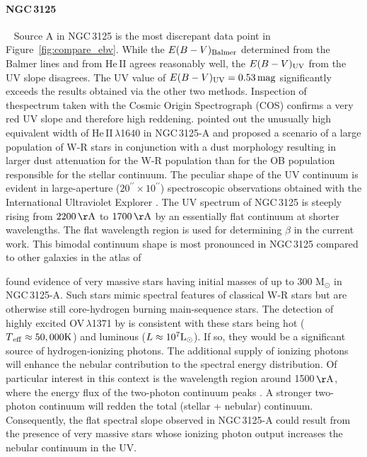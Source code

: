 \documentclass[linenumbers]{aastex63}
\begin{document}
\paragraph{NGC\,3125~}~
Source A in NGC\,3125 is the most discrepant data point in Figure~\ref{fig:compare_ebv}. While the ${E(B-V)_{\rm Balmer}}$ determined from the Balmer lines and from He\,II agrees reasonably well, the ${E(B-V)_{\rm UV}}$ from the UV slope disagrees. The UV value of $E(B-V)_{\rm UV} = 0.53\,{\rm mag}$ significantly exceeds the results obtained via the other two methods. Inspection of thespectrum taken with the Cosmic Origin Spectrograph (COS) confirms a very red UV slope and therefore high reddening. \citet{chandar_ngc_2004} pointed out the unusually high equivalent width of He\,II\,$\lambda$1640 in NGC\,3125-A and proposed a scenario of a large population of W-R stars in conjunction with a dust morphology resulting in larger dust attenuation for the W-R population than for the OB population responsible for the stellar continuum. The peculiar shape of the UV continuum is evident in large-aperture ($20^{\prime\prime} \times 10^{\prime\prime}$) spectroscopic observations obtained with the International Ultraviolet Explorer \citep{kinney_atlas_1993}. The UV spectrum of NGC\,3125 is steeply rising from $2200\,{\rm \AA}$ to $1700\,{\rm \AA}$ by an essentially flat continuum at shorter wavelengths. The flat wavelength region is used for determining $\beta$ in the current work. This bimodal continuum shape is most pronounced in NGC\,3125 compared to other galaxies in the atlas of \citep{kinney_atlas_1993}

\citet{wofford_extreme_2023} found evidence of very massive stars having initial masses of up to 300 M$_{\odot}$ in NGC\,3125-A. Such stars mimic spectral features of classical W-R stars but are otherwise still core-hydrogen burning main-sequence stars. The detection of highly excited OV\,$\lambda$1371 by \citet{wofford_extreme_2023} is consistent with these stars being hot ($T{\rm _{eff} \approx 50, 000 K}$) and luminous ($L \approx 10^7 {\rm L_{\odot}}$). If so, they would be a significant source of hydrogen-ionizing photons. The additional supply of ionizing photons will enhance the nebular contribution to the spectral energy distribution. Of particular interest in this context is the wavelength region around 1500\,${\rm \AA}$, where the energy flux of the two-photon continuum peaks \citep{johnstone_hydrogen_2012}. A stronger two-photon continuum will redden the total (stellar + nebular) continuum. Consequently, the flat spectral slope observed in NGC\,3125-A could result from the presence of very massive stars whose ionizing photon output increases the nebular continuum in the UV.
\end{document}
